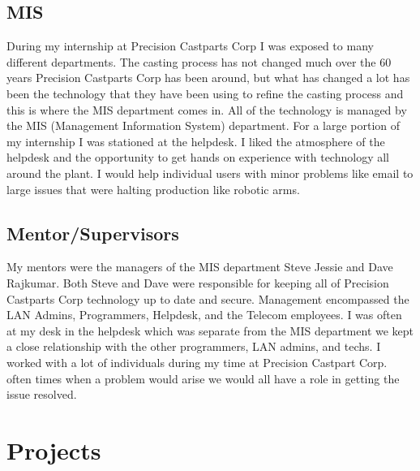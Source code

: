 \documentclass[letterpaper,10pt,notitlepage,fleqn]{article}
\begin{document}
\subsection{MIS}
\indent During my internship at Precision Castparts Corp I was exposed to many 
different departments. The casting process has not changed much over the 60 years 
Precision Castparts Corp has been around, but what has changed a lot has been the 
technology that they have been using to refine the casting process and this is where 
the MIS department comes in. All of the technology is managed by the MIS 
(Management Information System) department. For a large 
portion of my internship I was stationed at the helpdesk. I liked the atmosphere 
of the helpdesk and the opportunity to get hands on experience with technology all
around the plant. I would help individual users with minor problems like email 
to large issues that were halting production like robotic arms. 

\subsection{Mentor/Supervisors}
\indent My mentors were the managers of the MIS department Steve Jessie and Dave 
Rajkumar. Both Steve and 
Dave were responsible for keeping all of Precision Castparts Corp technology up 
to date and secure. Management encompassed the LAN Admins, Programmers, 
Helpdesk, and the Telecom employees. I was often at my desk in the 
helpdesk which was separate from the MIS department we kept a close relationship 
with the other programmers, LAN admins, and techs. I worked with a lot of individuals 
during my time at Precision Castpart Corp. often times when a problem would arise 
we would all have a role in getting the issue resolved. 

\section{Projects}
\end{document}
